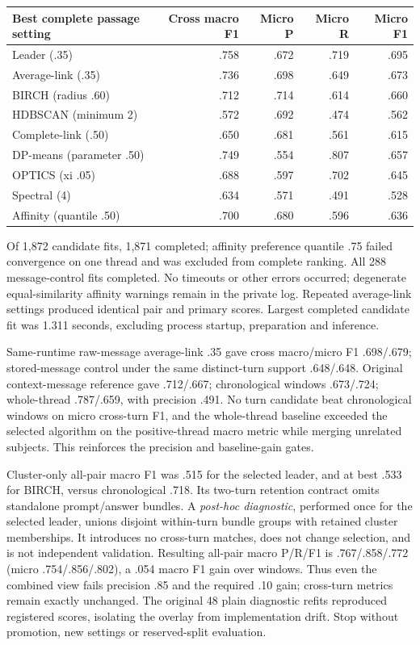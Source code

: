 \documentclass[11pt]{article}
\begin{document}
\begin{center}
\begin{tabular}{lrrrr}
\toprule
Best complete passage setting & Cross macro F1 & Micro P & Micro R & Micro F1\\
\midrule
Leader (.35) & .758 & .672 & .719 & .695\\
Average-link (.35) & .736 & .698 & .649 & .673\\
BIRCH (radius .60) & .712 & .714 & .614 & .660\\
HDBSCAN (minimum 2) & .572 & .692 & .474 & .562\\
Complete-link (.50) & .650 & .681 & .561 & .615\\
DP-means (parameter .50) & .749 & .554 & .807 & .657\\
OPTICS (xi .05) & .688 & .597 & .702 & .645\\
Spectral (4) & .634 & .571 & .491 & .528\\
Affinity (quantile .50) & .700 & .680 & .596 & .636\\
\bottomrule
\end{tabular}
\end{center}
Of 1,872 candidate fits, 1,871 completed; affinity preference quantile .75 failed
convergence on one thread and was excluded from complete ranking. All 288
message-control fits completed. No timeouts or other errors occurred; degenerate
equal-similarity affinity warnings remain in the private log. Repeated average-link
settings produced identical pair and primary scores. Largest completed candidate
fit was 1.311 seconds, excluding process startup, preparation and inference.

Same-runtime raw-message average-link .35 gave cross macro/micro F1 .698/.679;
stored-message control under the same distinct-turn support .648/.648. Original
context-message reference gave .712/.667; chronological windows .673/.724;
whole-thread .787/.659, with precision .491. No turn candidate beat chronological
windows on micro cross-turn F1, and the whole-thread baseline exceeded the
selected algorithm on the positive-thread macro metric while merging unrelated
subjects. This reinforces the precision and baseline-gain gates.

Cluster-only all-pair macro F1 was .515 for the selected leader, and at best .533
for BIRCH, versus chronological .718. Its two-turn retention contract omits
standalone prompt/answer bundles. A \emph{post-hoc diagnostic}, performed once
for the selected leader, unions disjoint within-turn bundle groups with retained
cluster memberships. It introduces no cross-turn matches, does not change
selection, and is not independent validation. Resulting all-pair macro P/R/F1
is .767/.858/.772 (micro .754/.856/.802), a .054 macro F1 gain over windows.
Thus even the combined view fails precision .85 and the required .10 gain;
cross-turn metrics remain exactly unchanged. The original 48 plain diagnostic
refits reproduced registered scores, isolating the overlay from implementation
drift. Stop without promotion, new settings or reserved-split evaluation.
\end{document}
